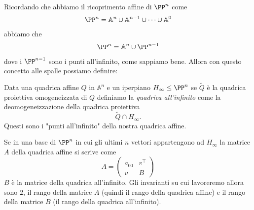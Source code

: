 \documentclass[11pt]{scrartcl}
\renewcommand{\AA}{\mathbb{A}}
\begin{document}
	Ricordando che abbiamo il ricoprimento affine di $\PP^n$ come 
	$$\PP^n = \AA^n \cup \AA^{n-1}\cup \dots \cup \AA^0$$
	abbiamo che 
	$$\PP^n = \AA^n \cup \PP^{n-1}$$
	dove i $\PP^{n-1}$ sono i punti all'infinito, come sappiamo bene. Allora con questo concetto alle spalle possiamo definire:
	\begin{definition}
		Data una quadrica affine $Q$ in $\AA^n$ e un iperpiano $H_\infty\le \PP^n$ se $\tilde{Q}$ è la quadrica proiettiva omogeneizzata di $Q$ definiamo la \textit{quadrica all'infinito} come la deomogeneizzazione della quadrica proiettiva
		$$\tilde{Q}\cap H_\infty.$$
		Questi sono i "punti all'infinito" della nostra quadrica affine.  
	\end{definition}
	Se in una base di $\PP^n$ in cui gli ultimi $n$ vettori appartengono ad $H_\infty$ la matrice $A$ della quadrica affine si scrive come
	$$A=
	\left(
	\begin{array}{c|c}
		a_{00} & v^\intercal \\
		\hline
		v & B
	\end{array}
	\right)
	$$
	$B$ è la matrice della quadrica all'infinito. Gli invarianti su cui lavoreremo allora sono $2$, il rango della matrice $A$ (quindi il rango della quadrica affine) e il rango della matrice $B$ (il rango della quadrica all'infinito).
\end{document}
